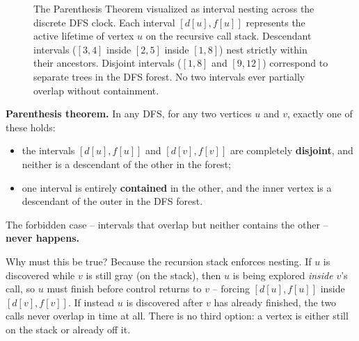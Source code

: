 \begin{figure}[h]
\caption{The Parenthesis Theorem visualized as interval nesting across the discrete DFS clock. Each interval $[d[u], f[u]]$ represents the active lifetime of vertex $u$ on the recursive call stack. Descendant intervals ($[3,4]$ inside $[2,5]$ inside $[1,8]$) nest strictly within their ancestors. Disjoint intervals ($[1,8]$ and $[9,12]$) correspond to separate trees in the DFS forest. No two intervals ever partially overlap without containment.}
\label{ch22:dfs-parenthesis}
\end{figure}

\begin{formalbox}
\textbf{Parenthesis theorem.} In any DFS, for any two vertices $u$ and $v$,
exactly one of these holds:
\begin{itemize}
\item the intervals $[d[u],f[u]]$ and $[d[v],f[v]]$ are completely
\textbf{disjoint}, and neither is a descendant of the other in the forest;
\item one interval is entirely \textbf{contained} in the other, and the inner
vertex is a descendant of the outer in the DFS forest.
\end{itemize}
The forbidden case -- intervals that overlap but neither contains the other --
\textbf{never happens.}
\end{formalbox}

Why must this be true? Because the recursion stack enforces nesting. If $u$ is
discovered while $v$ is still gray (on the stack), then $u$ is being explored
\emph{inside} $v$'s call, so $u$ must finish before control returns to $v$ --
forcing $[d[u],f[u]]$ inside $[d[v],f[v]]$. If instead $u$ is discovered after
$v$ has already finished, the two calls never overlap in time at all. There is no
third option: a vertex is either still on the stack or already off it.

